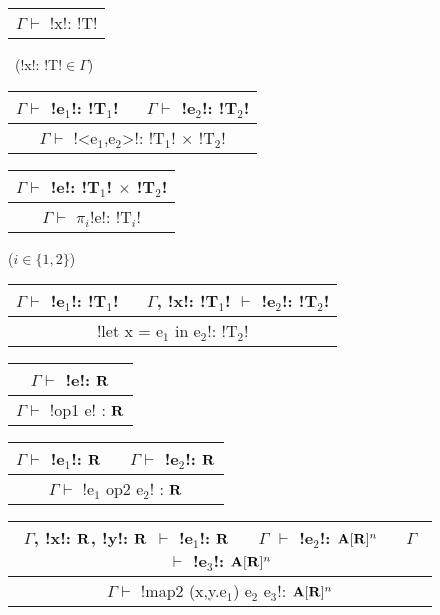 \begin{figure*}[tb]
    \centering
    \begin{tabular}{c} 
    \\\hline
    $\Gamma \vdash$ !x!: !T!
    \end{tabular}~(!x!: !T!$\in\Gamma$)
    \hspace{0.5cm}
    \begin{tabular}{c}
    $\Gamma \vdash$ !e$_1$!: !T$_1$! $\quad$ $\Gamma \vdash$ !e$_2$!: !T$_2$! \\\hline  
    $\Gamma \vdash$ !<e$_1$,e$_2$>!: !T$_1$! $\times$ !T$_2$!
    \end{tabular}
    \hspace{0.5cm}
    \begin{tabular}{c}
        $\Gamma \vdash$ !e!: !T$_1$! $\times$ !T$_2$! \\\hline  
        $\Gamma \vdash$ $\pi_i$!e!: !T$_i$!
    \end{tabular}($i\in\{1,2\}$)

    \begin{tabular}{c}
    $\Gamma \vdash$ !e$_1$!: !T$_1$! $\quad$ $\Gamma$, !x!: !T$_1$! $\vdash$ !e$_2$!: !T$_2$! \\\hline
    !let x = e$_1$ in e$_2$!: !T$_2$!
    \end{tabular}
    \hspace{0.5cm}
    \begin{tabular}{c}
        $\Gamma \vdash$ !e!: $\mathbf{R}$ \\\hline  
        $\Gamma \vdash$ !op1 e! : $\mathbf{R}$
    \end{tabular}
    \hspace{0.5cm}
    \begin{tabular}{c}
        $\Gamma \vdash$ !e$_1$!: $\mathbf{R}$ $\quad$ $\Gamma \vdash$ !e$_2$!: $\mathbf{R}$ \\\hline  
        $\Gamma \vdash$ !e$_1$ op2 e$_2$! : $\mathbf{R}$
        \end{tabular}
 
    \begin{tabular}{c}
        $\Gamma$, !x!: $\mathbf{R}$, !y!: $\mathbf{R}$ $\vdash$ !e$_1$!: $\mathbf{R}$ 
        $\quad$ $\Gamma$ $\vdash$ !e$_2$!: $\mathbf{A}[\mathbf{R}]^{n}$
        $\quad$ $\Gamma$ $\vdash$ !e$_3$!: $\mathbf{A}[\mathbf{R}]^{n}$
        \\\hline  
        $\Gamma \vdash$ !map2 (x,y.e$_1$) e$_2$ e$_3$!: $\mathbf{A}[\mathbf{R}]^{n}$
    \end{tabular}


\end{figure*}
